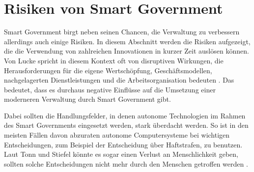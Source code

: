 \section{Risiken von Smart Government}
Smart Government birgt neben seinen Chancen, die Verwaltung zu verbessern allerdings auch einige Risiken.
In diesem Abschnitt werden die Risiken aufgezeigt, die die Verwendung von zahlreichen Innovationen in kurzer Zeit auslösen können.
Von Lucke spricht in diesem Kontext oft von disruptiven Wirkungen, die \glqq{}Herausforderungen für die eigene Wertschöpfung, Geschäftsmodellen, nachgelagerten Dienstleistungen und die Arbeitsorganisation bedeuten\grqq{} \citep[][S.172	]{von_Lucke_2016}.
Das bedeutet, dass es durchaus negative Einflüsse auf die Umsetzung einer moderneren Verwaltung durch Smart Government gibt. 
\par
Dabei sollten die Handlungsfelder, in denen autonome Technologien im Rahmen des Smart Governments eingesetzt werden, stark überdacht werden.
So ist in den meisten Fällen davon abzuraten autonome Computersysteme bei wichtigen Entscheidungen, zum Beispiel der Entscheidung über Haftstrafen, zu benutzen.
Laut Tonn und Stiefel könnte es sogar einen Verlust an Menschlichkeit geben, sollten solche Entscheidungen nicht mehr durch den Menschen getroffen werden \citep[Vgl.][S. 322]{Tonn2012}.


